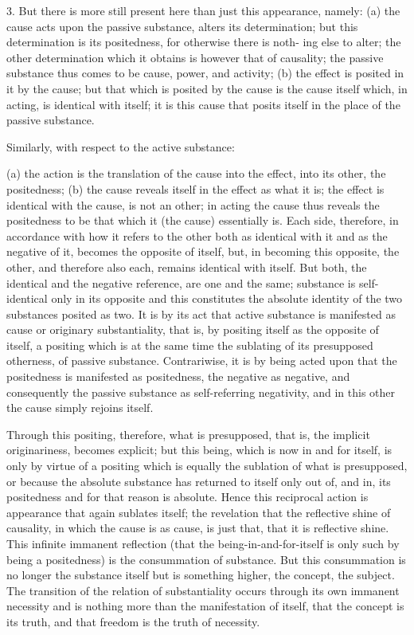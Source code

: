 3. But there is more still present here than just this appearance, namely:
(a) the cause acts upon the passive substance, alters its determination;
but this determination is its positedness, for otherwise there is noth-
ing else to alter; the other determination which it obtains is however
that of causality; the passive substance thus comes to be cause, power,
and activity;
(b) the effect is posited in it by the cause; but that which is posited by
the cause is the cause itself which, in acting, is identical with itself;
it is this cause that posits itself in the place of the passive substance.

Similarly, with respect to the active substance:

(a) the action is the translation of the cause into the effect,
into its other, the positedness;
(b) the cause reveals itself in the effect as what it is;
the effect is identical with the cause, is not an other;
in acting the cause thus reveals the positedness to be
that which it (the cause) essentially is.
Each side, therefore, in accordance with how it refers to the other both
as identical with it and as the negative of it, becomes the opposite of
itself, but, in becoming this opposite, the other, and therefore also each,
remains identical with itself.
But both, the identical and the negative
reference, are one and the same; substance is self-identical only in its
opposite and this constitutes the absolute identity of the two substances
posited as two. It is by its act that active substance is manifested as cause
or originary substantiality, that is, by positing itself as the opposite of
itself, a positing which is at the same time the sublating of its presupposed
otherness, of passive substance. Contrariwise, it is by being acted upon that
the positedness is manifested as positedness, the negative as negative, and
consequently the passive substance as self-referring negativity, and in this
other the cause simply rejoins itself.

Through this positing, therefore, what is presupposed,
that is, the implicit originariness, becomes explicit;
but this being, which is now in and for itself,
is only by virtue of a positing
which is equally the sublation of what is presupposed,
or because the absolute substance has returned to itself
only out of, and in, its positedness
and for that reason is absolute.
Hence this reciprocal action is
appearance that again sublates itself;
the revelation that the reflective shine of causality,
in which the cause is as cause,
is just that, that it is reflective shine.
This infinite immanent reflection
(that the being-in-and-for-itself is
only such by being a positedness)
is the consummation of substance.
But this consummation is no longer the substance itself
but is something higher, the concept, the subject.
The transition of the relation of substantiality
occurs through its own immanent necessity
and is nothing more than the manifestation of itself,
that the concept is its truth,
and that freedom is the truth of necessity.

